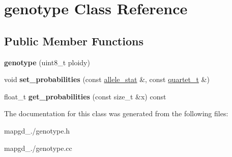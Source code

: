 \hypertarget{classgenotype}{\section{genotype Class Reference}
\label{classgenotype}
}
\subsection*{Public Member Functions}
\begin{DoxyCompactItemize}
\item 
\hypertarget{classgenotype_af5ebf8bb0c53dca2400d58fabf82f445}{{\bfseries genotype} (uint8\-\_\-t ploidy)}\label{classgenotype_af5ebf8bb0c53dca2400d58fabf82f445}

\item 
\hypertarget{classgenotype_a81684d812333591a9c63705732a3da2b}{void {\bfseries set\-\_\-probabilities} (const \hyperlink{classallele__stat}{allele\-\_\-stat} \&, const \hyperlink{structquartet}{quartet\-\_\-t} \&)}\label{classgenotype_a81684d812333591a9c63705732a3da2b}

\item 
\hypertarget{classgenotype_a38b6d54674d32091f6b8f830319fa875}{float\-\_\-t {\bfseries get\-\_\-probabilities} (const size\-\_\-t \&x) const }\label{classgenotype_a38b6d54674d32091f6b8f830319fa875}

\end{DoxyCompactItemize}


The documentation for this class was generated from the following files\-:\begin{DoxyCompactItemize}
\item 
mapgd\-\_./genotype.\-h\item 
mapgd\-\_./genotype.\-cc\end{DoxyCompactItemize}
